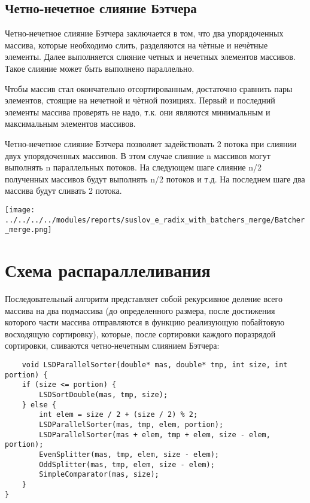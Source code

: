 \documentclass{article}
\begin{document}
\subsection{Четно-нечетное слияние Бэтчера}
\par Четно-нечетное слияние Бэтчера заключается в том, что два упорядоченных массива, которые необходимо слить, разделяются на чѐтные и нечѐтные элементы. Далее выполняется слияние четных и нечетных элементов массивов. Такое слияние может быть выполнено параллельно.
\par Чтобы массив стал окончательно отсортированным, достаточно сравнить пары элементов, стоящие на нечетной и чѐтной позициях. Первый и последний элементы массива проверять не надо, т.к. они являются минимальным и максимальным элементов массивов.
\par Четно-нечетное слияние Бэтчера позволяет задействовать 2 потока при слиянии двух упорядоченных массивов. В этом случае слияние n массивов могут выполнять n параллельных потоков. На следующем шаге слияние n/2 полученных массивов будут выполнять n/2 потоков и т.д. На последнем шаге два массива будут сливать 2 потока.
\begin{center}
\texttt{[image: ../../../../modules/reports/suslov\_e\_radix\_with\_batchers\_merge/Batcher\_merge.png]}
\label{visina1}
\end{center}
\newpage

\section{Схема распараллеливания}
Последовательный алгоритм представляет собой рекурсивное деление всего массива на два подмассива (до определенного размера, после достижения которого части массива отправляются в функцию реализующую побайтовую восходящую сортировку), которые, после сортировки каждого поразрядой сортировки, сливаются четно-нечетным слиянием Бэтчера:
\vspace{10pt}
\begin{lstlisting}
    void LSDParallelSorter(double* mas, double* tmp, int size, int portion) {
    if (size <= portion) {
        LSDSortDouble(mas, tmp, size);
    } else {
        int elem = size / 2 + (size / 2) % 2;
        LSDParallelSorter(mas, tmp, elem, portion);
        LSDParallelSorter(mas + elem, tmp + elem, size - elem, portion);
        EvenSplitter(mas, tmp, elem, size - elem);
        OddSplitter(mas, tmp, elem, size - elem);
        SimpleComparator(mas, size);
    }
}
\end{lstlisting}
\vspace{-25pt}
\end{document}
